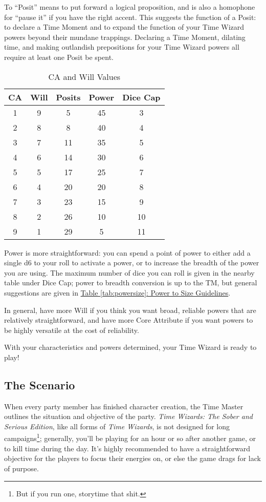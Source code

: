 \documentclass{article}
\newcommand{\twsse}{\emph{Time Wizards: The Sober and Serious Edition}}
\newcommand{\tw}{\emph{Time Wizards}}
\begin{document}
To ``Posit'' means to put forward a logical proposition, and is also a homophone for ``pause
it'' if you have the right accent. This suggests the function of a Posit: to declare a Time
Moment and to expand the function of your Time Wizard powers beyond their mundane trappings.
Declaring a Time Moment, dilating time, and making outlandish prepositions for your Time Wizard
powers all require at least one Posit be spent.

\begin{wraptable}{r}{0.5\textwidth}
   \caption{CA and Will Values}
   \label{tab:cawill}

   \begin{tabular}{cc|ccc}
   \textbf{CA} & \textbf{Will} & Posits & Power & Dice Cap\\ \hline
      1 & 9 &  5 & 45 &  3\\
      2 & 8 &  8 & 40 &  4\\
      3 & 7 & 11 & 35 &  5\\
      4 & 6 & 14 & 30 &  6\\
      5 & 5 & 17 & 25 &  7\\
      6 & 4 & 20 & 20 &  8\\
      7 & 3 & 23 & 15 &  9\\
      8 & 2 & 26 & 10 & 10\\
      9 & 1 & 29 &  5 & 11
   \end{tabular}
\end{wraptable}

Power is more straightforward: you can spend a point of power to either add a single d6 to your
roll to activate a power, or to increase the breadth of the power you are using. The maximum
number of dice you can roll is given in the nearby table under Dice Cap; power to breadth
conversion is up to the TM, but general suggestions are given in
\hyperref[tab:powersize]{Table \ref*{tab:powersize}: Power to Size Guidelines}.

In general, have more Will if you think you want broad, reliable powers that are relatively
straightforward, and have more Core Attribute if you want powers to be highly versatile at the
cost of reliability.

With your characteristics and powers determined, your Time Wizard is ready to play!

\subsection{The Scenario} \label{ssec:scenario}
When every party member has finished character creation, the Time Master outlines the situation
and objective of the party. \twsse{}, like all forms of \tw{}, is not designed for long
campaigns\footnote{But if you run one, storytime that shit.}; generally, you'll be playing for
an hour or so after another game, or to kill time during the day. It's highly recommended to
have a straightforward objective for the players to focus their energies on, or else the game
drags for lack of purpose.
\end{document}
